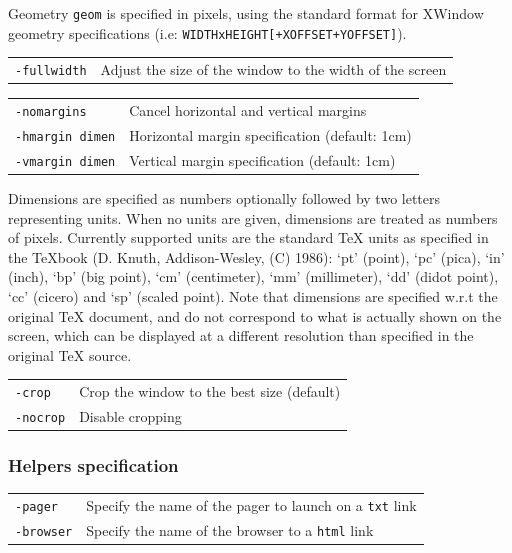 \documentclass[12pt]{article}
\begin{document}
Geometry \verb"geom" is specified in pixels, using the standard format
for XWindow geometry specifications (i.e:
\verb"WIDTHxHEIGHT[+XOFFSET+YOFFSET]").

\medskip\noindent\begin{tabular}{ll}
\verb"-fullwidth"          & Adjust the size of the window to the width of the screen
\end{tabular}

\medskip\noindent\begin{tabular}{ll}
\verb"-nomargins"          & Cancel horizontal and vertical margins \\
\verb"-hmargin dimen"      & Horizontal margin specification (default: 1cm) \\
\verb"-vmargin dimen"      & Vertical margin specification   (default: 1cm) \\
\end{tabular}

Dimensions are specified as numbers optionally followed by two letters
representing units. When no units are given, dimensions are treated
as numbers of pixels. Currently supported units are the standard TeX
units as specified in the TeXbook (D. Knuth, Addison-Wesley, (C)
1986):
 `pt' (point), `pc' (pica), `in' (inch), `bp' (big point),
 `cm' (centimeter), `mm' (millimeter), `dd' (didot point),
 `cc' (cicero) and `sp' (scaled point).
Note that dimensions are specified w.r.t the original TeX document,
and do not correspond to what is actually shown on the screen, which
can be displayed at a different resolution than specified in the
original TeX source.

\medskip\noindent\begin{tabular}{ll}
\verb"-crop"               & Crop the window to the best size (default) \\
\verb"-nocrop"             & Disable cropping
\end{tabular}

\subsubsection*{Helpers specification}

\medskip\noindent\begin{tabular}{ll}
\verb"-pager" & Specify the name of the pager to launch on a \verb"txt" link\\
\verb"-browser" & Specify the name of the browser to a \verb"html" link\\
\end{tabular}
\end{document}
